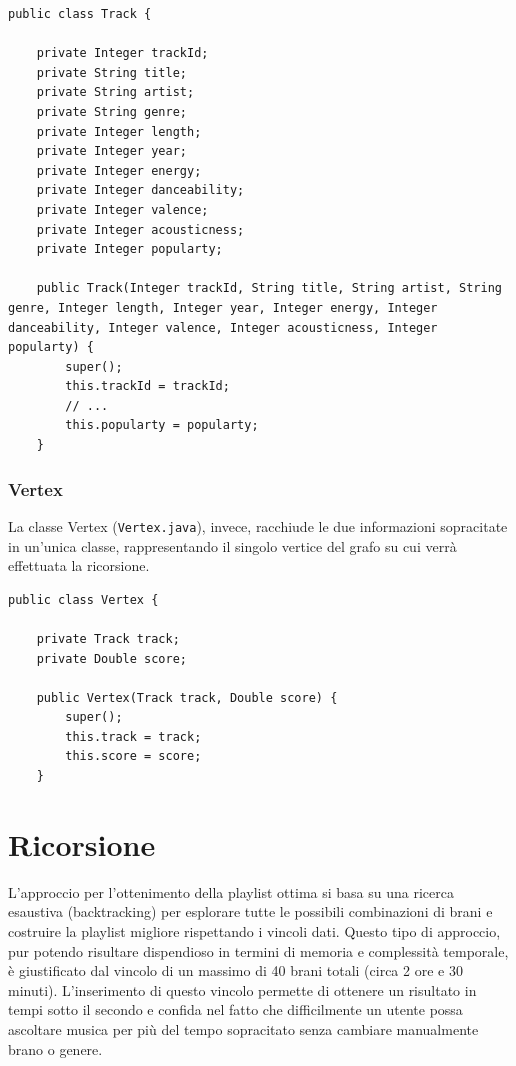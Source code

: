 \documentclass[12pt, a4paper]{article}
\begin{document}
\begin{lstlisting}
public class Track {

	private Integer trackId;
	private String title;
	private String artist;
	private String genre;
	private Integer length;
	private Integer year;
	private Integer energy;
	private Integer danceability;
	private Integer valence;
	private Integer acousticness;
	private Integer popularty;
	
	public Track(Integer trackId, String title, String artist, String genre, Integer length, Integer year, Integer energy, Integer danceability, Integer valence, Integer acousticness, Integer popularty) {
		super();
		this.trackId = trackId;
		// ...
		this.popularty = popularty;
	}
\end{lstlisting}

\subsubsection{Vertex}

La classe Vertex (\texttt{Vertex.java}), invece, racchiude le due informazioni sopracitate in un'unica classe, rappresentando il singolo vertice del grafo su cui verrà effettuata la ricorsione.

\begin{lstlisting}
public class Vertex {

	private Track track;
	private Double score;

	public Vertex(Track track, Double score) {
		super();
		this.track = track;
		this.score = score;
	}

\end{lstlisting}

\newpage
\section{Ricorsione}

L'approccio per l'ottenimento della playlist ottima si basa su una ricerca esaustiva (backtracking) per esplorare tutte le possibili combinazioni di brani e costruire la playlist migliore rispettando i vincoli dati. Questo tipo di approccio, pur potendo risultare dispendioso in termini di memoria e complessità temporale, è giustificato dal vincolo di un massimo di 40 brani totali (circa 2 ore e 30 minuti). L'inserimento di questo vincolo permette di ottenere un risultato in tempi sotto il secondo e confida nel fatto che difficilmente un utente possa ascoltare musica per più del tempo sopracitato senza cambiare manualmente brano o genere.
\end{document}
